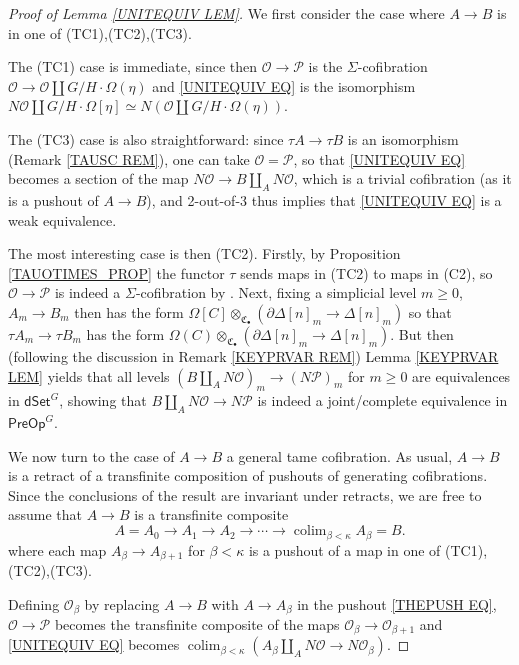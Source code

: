 \documentclass[a4paper,10pt
,draft
]{article}%
\numberwithin{equation}{section}
\numberwithin{figure}{section}
\theoremstyle{definition} %
\DeclareMathOperator{\colim}{colim}%
\renewcommand{\O}{\ensuremath{\mathcal O}}
\renewcommand{\P}{\ensuremath{\mathcal P}}
\newcommand{\1}{\ensuremath{\mathbbm 1}}%
\begin{document}
\begin{proof}[Proof of Lemma \ref{UNITEQUIV LEM}]
	We first consider the case where $A\to B$ is in one of (TC1),(TC2),(TC3).
	
	The (TC1) case is immediate, 
	since then
	$\mathcal{O} \to \mathcal{P}$
	is the $\Sigma$-cofibration
	$\mathcal{O} \to \mathcal{O} \amalg G/H \cdot \Omega(\eta)$   and \eqref{UNITEQUIV EQ}
	is the isomorphism
	$N\mathcal{O} \amalg G/H\cdot \Omega[\eta] \simeq 
	N\left( \mathcal{O} \amalg G/H \cdot \Omega(\eta) \right)$.
	
	The (TC3) case is also straightforward:
	since $\tau A \to \tau B$ is an isomorphism
	(Remark \ref{TAUSC REM}), one can take 
	$\mathcal{O}=\mathcal{P}$, so that 
	\eqref{UNITEQUIV EQ}
	becomes a section of the map
	$N \mathcal{O} \to B \amalg_{A} N \mathcal{O}$, which is a trivial cofibration (as it is a pushout of $A \to B$),
	and 2-out-of-3 thus implies that \eqref{UNITEQUIV EQ} is a weak equivalence.

	The most interesting case is then (TC2).
	Firstly, by Proposition \ref{TAUOTIMES_PROP} the functor $\tau$ sends maps in (TC2) to maps in (C2), 
	so $\O \to \P$ is indeed a $\Sigma$-cofibration
	by \cite[Prop. \ref{OC-SIGMAG_COF PROP}]{BP_FCOP}.
	Next, fixing a simplicial level $m\geq 0$,
	$A_m \to B_m$ then has the form
	$\Omega[C] \otimes_{\mathfrak{C}_{\bullet}} \left(\partial \Delta[n]_m \to \Delta[n]_m\right)$ so that
	$\tau A_m \to \tau B_m$ has the form
	$\Omega(C) \otimes_{\mathfrak{C}_{\bullet}} \left(\partial \Delta[n]_m \to \Delta[n]_m\right)$.
	But then (following the discussion in 
	Remark \ref{KEYPRVAR REM})
	Lemma \ref{KEYPRVAR LEM}
	yields that all levels
	$(B \amalg_{A} N \mathcal{O})_m
	\to 
	(N \mathcal{P})_m$
	for $m \geq 0$
	are equivalences in $\mathsf{dSet}^G$,
	showing that 
	$B \amalg_{A} N \mathcal{O}
	\to 
	N \mathcal{P}$
	is indeed a joint/complete equivalence in
	$\mathsf{PreOp}^G$.

	We now turn to the case of $A \to B$ a general tame cofibration.
	As usual, $A \to B$ is a retract of a transfinite composition of pushouts of generating cofibrations.
	Since the conclusions of the result are invariant under retracts,
	we are free to assume that $A \to B$ is a transfinite composite
	\[
	A = A_0 \to A_1 \to A_2 \to \cdots \to 
	\colim_{\beta < \kappa} A_{\beta} = B.
	\]
	where each map $A_{\beta} \to A_{\beta +1}$
	for $\beta < \kappa$ is a pushout of a map in one of (TC1),(TC2),(TC3).

	Defining $\mathcal{O}_{\beta}$ by replacing $A \to B$ with $A \to A_{\beta}$ in the pushout \eqref{THEPUSH EQ},
	$\mathcal{O} \to \mathcal{P}$ becomes the transfinite composite of the maps $\mathcal{O}_{\beta} \to \mathcal{O}_{\beta + 1}$
	and \eqref{UNITEQUIV EQ} becomes
	$
	\colim_{\beta < \kappa} \left( 
	A_{\beta} \amalg_{A} N \mathcal{O}
	\to 
	N \mathcal{O}_{\beta}
	\right)
	$.


\end{proof}
\end{document}

